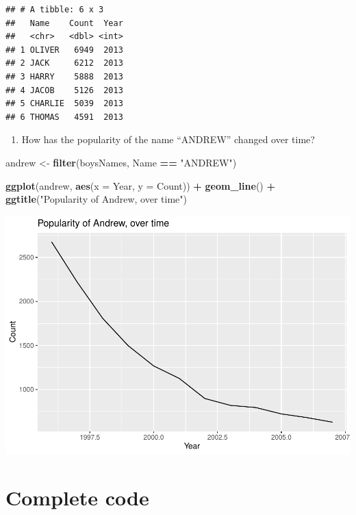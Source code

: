 \documentclass[
]{book}
\newenvironment{Shaded}{\begin{snugshade}}{\end{snugshade}}
\newcommand{\DataTypeTok}[1]{\textcolor[rgb]{0.13,0.29,0.53}{#1}}
\newcommand{\KeywordTok}[1]{\textcolor[rgb]{0.13,0.29,0.53}{\textbf{#1}}}
\newcommand{\NormalTok}[1]{#1}
\newcommand{\OperatorTok}[1]{\textcolor[rgb]{0.81,0.36,0.00}{\textbf{#1}}}
\newcommand{\StringTok}[1]{\textcolor[rgb]{0.31,0.60,0.02}{#1}}
\providecommand{\tightlist}{%
  \setlength{\itemsep}{0pt}\setlength{\parskip}{0pt}}
\begin{document}
\begin{alert}
\begin{verbatim}
## # A tibble: 6 x 3
##   Name    Count  Year
##   <chr>   <dbl> <int>
## 1 OLIVER   6949  2013
## 2 JACK     6212  2013
## 3 HARRY    5888  2013
## 4 JACOB    5126  2013
## 5 CHARLIE  5039  2013
## 6 THOMAS   4591  2013
\end{verbatim}

\begin{enumerate}
\def\labelenumi{\arabic{enumi}.}
\setcounter{enumi}{3}
\tightlist
\item
  How has the popularity of the name ``ANDREW'' changed over time?
\end{enumerate}

\begin{Shaded}
\begin{Highlighting}[]
\NormalTok{andrew \textless{}{-}}\StringTok{ }\KeywordTok{filter}\NormalTok{(boysNames, Name }\OperatorTok{==}\StringTok{ "ANDREW"}\NormalTok{)}

\KeywordTok{ggplot}\NormalTok{(andrew, }\KeywordTok{aes}\NormalTok{(}\DataTypeTok{x =}\NormalTok{ Year, }\DataTypeTok{y =}\NormalTok{ Count)) }\OperatorTok{+}
\StringTok{    }\KeywordTok{geom\_line}\NormalTok{() }\OperatorTok{+}
\StringTok{    }\KeywordTok{ggtitle}\NormalTok{(}\StringTok{"Popularity of Andrew, over time"}\NormalTok{)}
\end{Highlighting}
\end{Shaded}

\includegraphics{R/RDataWrangling/figures/unnamed-chunk-275-1.pdf}

\end{alert}

\hypertarget{complete-code}{%
\section{Complete code}\label{complete-code}}
\end{document}
